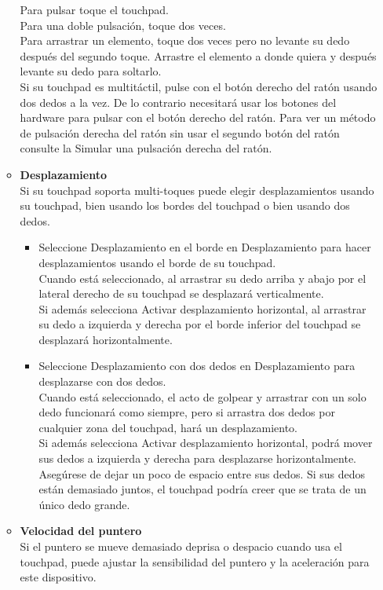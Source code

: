 \begin{itemize}
\begin{itemize}
Para pulsar toque el touchpad.\\
Para una doble pulsación, toque dos veces.\\
Para arrastrar un elemento, toque dos veces pero no levante su dedo después del segundo toque. Arrastre el elemento a donde quiera y después levante su dedo para soltarlo.\\
Si su touchpad es multitáctil, pulse con el botón derecho del ratón usando dos dedos a la vez. De lo contrario necesitará usar los botones del hardware para pulsar con el botón derecho del ratón. Para ver un método de pulsación derecha del ratón sin usar el segundo botón del ratón consulte la Simular una pulsación derecha del ratón.
\item{\bf Desplazamiento}\\
Si su touchpad soporta multi-toques puede elegir desplazamientos usando su touchpad, bien usando los bordes del touchpad o bien usando dos dedos.\\
\begin{itemize}
\item Seleccione Desplazamiento en el borde en Desplazamiento para hacer desplazamientos usando el borde de su touchpad.\\ Cuando está seleccionado, al arrastrar su dedo arriba y abajo por el lateral derecho de su touchpad se desplazará verticalmente.\\ Si además selecciona Activar desplazamiento horizontal, al arrastrar su dedo a izquierda y derecha por el borde inferior del touchpad se desplazará horizontalmente.

\item Seleccione Desplazamiento con dos dedos en Desplazamiento para desplazarse con dos dedos.\\
Cuando está seleccionado, el acto de golpear y arrastrar con un solo dedo funcionará como siempre, pero si arrastra dos dedos por cualquier zona del touchpad, hará un desplazamiento.\\ Si además selecciona Activar desplazamiento horizontal, podrá mover sus dedos a izquierda y derecha para desplazarse horizontalmente. Asegúrese de dejar un poco de espacio entre sus dedos. Si sus dedos están demasiado juntos, el touchpad podría creer que se trata de un único dedo grande.
\end{itemize}
\item{\bf Velocidad del puntero}\\
Si el puntero se mueve demasiado deprisa o despacio cuando usa el touchpad, puede ajustar la sensibilidad del puntero y la aceleración para este dispositivo.\\


\end{itemize}
\end{itemize}
